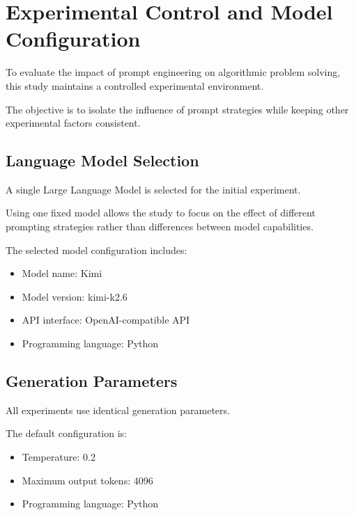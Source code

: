 \section{Experimental Control and Model Configuration}

To evaluate the impact of prompt engineering on algorithmic problem solving,
this study maintains a controlled experimental environment.

The objective is to isolate the influence of prompt strategies while keeping
other experimental factors consistent.


\subsection{Language Model Selection}


A single Large Language Model is selected for the initial experiment.

Using one fixed model allows the study to focus on the effect of different
prompting strategies rather than differences between model capabilities.


The selected model configuration includes:

\begin{itemize}

\item Model name: Kimi

\item Model version: kimi-k2.6

\item API interface: OpenAI-compatible API

\item Programming language: Python

\end{itemize}



\subsection{Generation Parameters}


All experiments use identical generation parameters.


The default configuration is:


\begin{itemize}

\item Temperature: 0.2

\item Maximum output tokens: 4096

\item Programming language: Python

\end{itemize}



